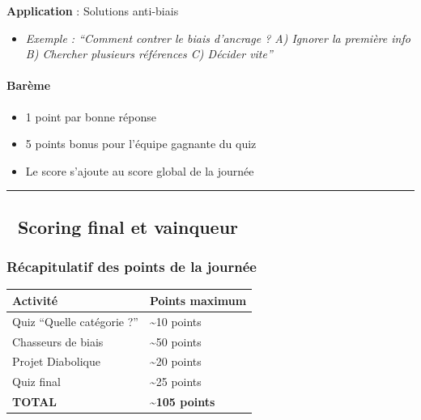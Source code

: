 \documentclass[
]{article}
\providecommand{\tightlist}{%
  \setlength{\itemsep}{0pt}\setlength{\parskip}{0pt}}
\begin{document}
\textbf{Application} : Solutions anti-biais

\begin{itemize}
\tightlist
\item
  \emph{Exemple : ``Comment contrer le biais d'ancrage ? A) Ignorer la
  première info B) Chercher plusieurs références C) Décider vite''}
\end{itemize}

\paragraph{\texorpdfstring{\textbf{Barème}}{Barème}}\label{baruxe8me}

\begin{itemize}
\tightlist
\item
  1 point par bonne réponse
\item
  5 points bonus pour l'équipe gagnante du quiz
\item
  Le score s'ajoute au score global de la journée
\end{itemize}

\begin{center}\rule{0.5\linewidth}{0.5pt}\end{center}

\subsection{🏅 Scoring final et
vainqueur}\label{scoring-final-et-vainqueur}

\subsubsection{\texorpdfstring{\textbf{Récapitulatif des points de la
journée}}{Récapitulatif des points de la journée}}\label{ruxe9capitulatif-des-points-de-la-journuxe9e}

\begin{longtable}[]{@{}ll@{}}
\toprule\noalign{}
Activité & Points maximum \\
\midrule\noalign{}
\endhead
\bottomrule\noalign{}
\endlastfoot
Quiz ``Quelle catégorie ?'' & \textasciitilde10 points \\
Chasseurs de biais & \textasciitilde50 points \\
Projet Diabolique & \textasciitilde20 points \\
Quiz final & \textasciitilde25 points \\
\textbf{TOTAL} & \textbf{\textasciitilde105 points} \\
\end{longtable}
\end{document}
